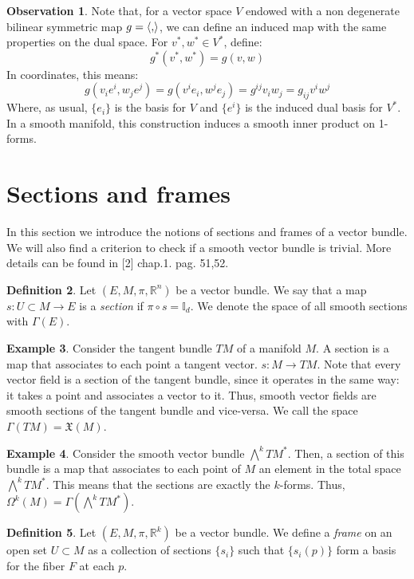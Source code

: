 \documentclass[12pt,a4paper]{report}
\theoremstyle{definition}
\newtheorem{Def}{Definition}[chapter]
\theoremstyle{Theorem}
\theoremstyle{definition}
\newtheorem{Ex}[Def]{Example}
\theoremstyle{definition}
\newtheorem{Obs}[Def]{Observation}
\begin{document}
	\begin{Obs}
		Note that, for a vector space $V$ endowed with a non degenerate bilinear symmetric map $g=\braket{,}$, we can define an induced map with the same properties on the dual space. For $v^*,w^*\in V^*$, define:
		$$g^*(v^*,w^*)=g(v,w)$$
		In coordinates, this means:
		$$g(v_ie^i,w_je^j)=g(v^ie_i,w^je_j)=g^{ij}v_iw_j=g_{ij}v^iw^j$$
		Where, as usual, $\{e_i\}$ is the basis for $V$ and $\{e^i\}$ is the induced dual basis for $V^*$.
		In a smooth manifold, this construction induces a smooth inner product on 1-forms.
	\end{Obs}
	\section{Sections and frames}
	In this section we introduce the notions of sections and frames of a vector bundle. We will also find a criterion to check if a smooth vector bundle is trivial. More details can be found in [2] chap.1. pag. 51,52.
	\begin{Def}\label{Def_5.5}
		Let $(E,M,\pi,\mathbb{R}^n)$ be a vector bundle. We say that a map \\$s:U\subset M\rightarrow E$ is a \textit{section} if $\pi\circ s=\mathbb{I}_d$. We denote the space of all smooth sections with $\Gamma(E)$.
	\end{Def}
	\begin{Ex}
		Consider the tangent bundle $TM$ of a manifold $M$. A section is a map that associates to each point a tangent vector. $s:M\rightarrow TM$. Note that every vector field is a section of the tangent bundle, since it operates in the same way: it takes a point and associates a vector to it. Thus, smooth vector fields are smooth sections of the tangent bundle and vice-versa. We call the space $\Gamma(TM)=\mathfrak{X}(M)$.
	\end{Ex}
	\begin{Ex}
		Consider the smooth vector bundle $\bigwedge^kTM^*$. Then, a section of this bundle is a map that associates to each point of $M$ an element in the total space $\bigwedge^kTM^*$. This means that the sections are exactly the $k$-forms. Thus, $\Omega^k(M)=\Gamma(\bigwedge^kTM^*)$.
	\end{Ex}
	\begin{Def}\label{Def_5.6}
		Let $(E,M,\pi,\mathbb{R}^k)$ be a vector bundle. We define a \textit{frame} on an open set $U\subset M$ as a collection of sections $\{s_i\}$ such that $\{s_i(p)\}$ form a basis for the fiber $F$ at each $p$. 
	\end{Def}
\end{document}
